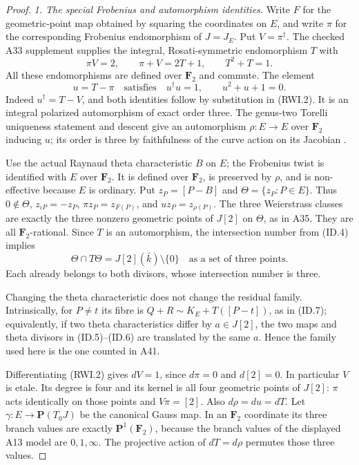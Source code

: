 \documentclass[11pt,a4paper]{article}
\begin{document}
\begin{proof}
\emph{1. The special Frobenius and automorphism identities.}
Write $F$ for the geometric-point map obtained by squaring
the coordinates on $E$, and write $\pi$ for the corresponding
Frobenius endomorphism of $J=J_E$. Put $V=\pi^\dagger$.
The checked A33 supplement supplies the integral,
Rosati-symmetric endomorphism $T$ with
\[
 \pi V=2,\qquad \pi+V=2T+1,\qquad T^2+T=1.
 \tag{RWI.2}
\]
All these endomorphisms are defined over $\mathbf F_2$ and
commute. The element
\[
 u=T-\pi
 \quad\text{satisfies}\quad
 u^\dagger u=1,\qquad u^2+u+1=0.
 \tag{RWI.3}
\]
Indeed $u^\dagger=T-V$, and both identities follow by
substitution in (RWI.2). It is an integral polarized
automorphism of exact order three. The genus-two Torelli
uniqueness statement and descent give an automorphism
$\rho:E\to E$ over $\mathbf F_2$ inducing $u$; its order
is three by faithfulness of the curve action on its
Jacobian \cite[Theorem~12.1 and Corollary~12.2,
pp.~38--39]{MilneJV}.

Use the actual Raynaud theta characteristic $B$ on $E$;
the Frobenius twist is identified with $E$ over
$\mathbf F_2$. It is defined over $\mathbf F_2$, is preserved
by $\rho$, and is non-effective because $E$ is ordinary.
Put $z_P=[P-B]$ and $\Theta=\{z_P:P\in E\}$.
Thus $0\notin\Theta$, $z_{\iota P}=-z_P$,
$\pi z_P=z_{F(P)}$, and $u z_P=z_{\rho(P)}$.
The three Weierstrass classes are exactly the three
nonzero geometric points of $J[2]$ on $\Theta$, as in A35.
They are all $\mathbf F_2$-rational. Since $T$ is an
automorphism, the intersection number from (ID.4) implies
\[
             \Theta\cap T\Theta
                =J[2](\bar k)\setminus\{0\}
             \quad\text{as a set of three points}.
 \tag{RWI.4}
\]
Each already belongs to both divisors, whose intersection
number is three.

Changing the theta characteristic does not change the
residual family. Intrinsically, for $P\ne t$ its fibre is
$Q+R\sim K_E+T([P-t])$, as in (ID.7); equivalently, if
two theta characteristics differ by $a\in J[2]$, the two
maps and theta divisors in (ID.5)--(ID.6) are translated
by the same $a$. Hence the family used here is the one
counted in A41.

Differentiating (RWI.2) gives $dV=1$, since $d\pi=0$
and $d[2]=0$. In particular $V$ is etale. Its degree is
four and its kernel is all four geometric points of
$J[2]$: $\pi$ acts identically on those points and
$V\pi=[2]$. Also $d\rho=du=dT$.
Let $\gamma:E\to\mathbf P(T_0J)$ be the canonical Gauss
map. In an $\mathbf F_2$ coordinate its three branch
values are exactly $\mathbf P^1(\mathbf F_2)$, because
the branch values of the displayed A13 model are
$0,1,\infty$. The projective action of $dT=d\rho$
permutes those three values.


\end{proof}
\end{document}
